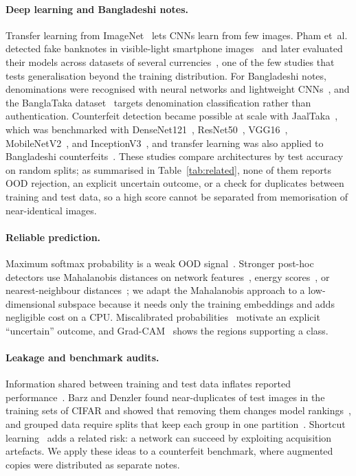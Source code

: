 \documentclass[pdflatex,iicol,sn-mathphys-num]{sn-jnl}
\begin{document}
\paragraph{Deep learning and Bangladeshi notes.} Transfer learning from
ImageNet~\cite{deng2009imagenet,yosinski2014transferable} lets CNNs learn from few
images. Pham et~al. detected fake banknotes in visible-light smartphone
images~\cite{pham2020} and later evaluated their models across datasets of several
currencies~\cite{pham2022}, one of the few studies that tests generalisation beyond the
training distribution. For Bangladeshi notes, denominations were recognised with neural
networks and lightweight CNNs~\cite{jahangir2007,linkon2020}, and the BanglaTaka
dataset~\cite{nuhash2025banglataka} targets denomination classification rather than
authentication. Counterfeit detection became possible at scale with
JaalTaka~\cite{piyas2025jaaltaka}, which was benchmarked with
DenseNet121~\cite{huang2017densenet}, ResNet50~\cite{he2016resnet},
VGG16~\cite{simonyan2015vgg}, MobileNetV2~\cite{sandler2018mobilenetv2}, and
InceptionV3~\cite{szegedy2016inception}, and transfer learning was also applied to
Bangladeshi counterfeits~\cite{tabassum2025}.
These studies compare architectures by test accuracy on random splits; as summarised in
Table~\ref{tab:related}, none of them reports OOD rejection, an explicit uncertain
outcome, or a check for duplicates between training and test data, so a high score
cannot be separated from memorisation of near-identical images.

\paragraph{Reliable prediction.} Maximum softmax probability is a weak OOD
signal~\cite{hendrycks2017baseline}. Stronger post-hoc detectors use Mahalanobis
distances on network features~\cite{lee2018mahalanobis}, energy
scores~\cite{liu2020energy}, or nearest-neighbour distances~\cite{sun2022knn}; we adapt
the Mahalanobis approach to a low-dimensional subspace because it needs only the training
embeddings and adds negligible cost on a CPU. Miscalibrated
probabilities~\cite{guo2017calibration} motivate an explicit ``uncertain'' outcome, and
Grad-CAM~\cite{selvaraju2017gradcam} shows the regions supporting a class.

\paragraph{Leakage and benchmark audits.} Information shared between training and test
data inflates reported performance~\cite{kaufman2012leakage,kapoor2023leakage}.
Barz and Denzler found near-duplicates of test images in the training sets of CIFAR and
showed that removing them changes model rankings~\cite{barz2020cifair}, and grouped data
require splits that keep each group in one partition~\cite{roberts2017cv}. Shortcut
learning~\cite{geirhos2020shortcut} adds a related risk: a network can succeed by
exploiting acquisition artefacts. We apply these ideas to a counterfeit benchmark, where
augmented copies were distributed as separate notes.
\end{document}
